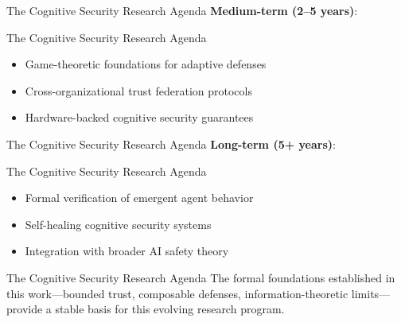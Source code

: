 \documentclass[
  ignorenonframetext,
]{beamer}
\begin{document}
\begin{frame}[allowframebreaks]{The Cognitive Security Research Agenda}
\textbf{Medium-term (2--5 years)}:

\end{frame}

\begin{frame}[allowframebreaks]{The Cognitive Security Research Agenda}
\begin{itemize}
\item Game-theoretic foundations for adaptive defenses
\item Cross-organizational trust federation protocols
\item Hardware-backed cognitive security guarantees
\end{itemize}

\end{frame}

\begin{frame}[allowframebreaks]{The Cognitive Security Research Agenda}
\textbf{Long-term (5+ years)}:

\end{frame}

\begin{frame}[allowframebreaks]{The Cognitive Security Research Agenda}
\begin{itemize}
\item Formal verification of emergent agent behavior
\item Self-healing cognitive security systems
\item Integration with broader AI safety theory
\end{itemize}

\end{frame}

\begin{frame}[allowframebreaks]{The Cognitive Security Research Agenda}
The formal foundations established in this work---bounded trust,
composable defenses, information-theoretic limits---provide a stable
basis for this evolving research program.
\end{frame}
\end{document}
